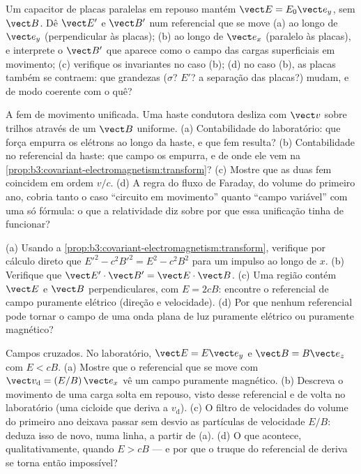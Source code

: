 \begin{exercise}[$\star$]\label{exo:b3:covariant-electromagnetism:4}
Um capacitor de placas paralelas em repouso mantém
$\vect E = E_0\vect e_y$, sem $\vect B$. Dê $\vect E'$ e $\vect B'$ num
referencial que se move (a) ao longo de $\vect e_y$ (perpendicular às
placas); (b) ao longo de $\vect
e_x$ (paralelo às placas), e interprete o $\vect B'$ que aparece como o
campo das cargas superficiais em movimento; (c) verifique os
invariantes no caso (b); (d) no caso (b), as placas também se contraem:
que grandezas ($\sigma$? $E'$? a separação das placas?) mudam, e de
modo coerente com o quê?
\end{exercise}

\begin{exercise}[$\star\star$]\label{exo:b3:covariant-electromagnetism:5}
A fem de movimento unificada. Uma haste condutora desliza com $\vect v$
sobre trilhos através de um $\vect B$ uniforme. (a) Contabilidade do
laboratório: que força empurra os elétrons ao longo da haste, e que fem
resulta? (b) Contabilidade no referencial da haste: que campo os
empurra, e de onde ele vem na
\cref{prop:b3:covariant-electromagnetism:transform}? (c) Mostre que as
duas fem coincidem em ordem $v/c$. (d) A regra do fluxo de Faraday, do
volume do primeiro ano, cobria tanto o caso ``circuito em movimento''
quanto ``campo variável'' com uma só fórmula: o que a relatividade diz
sobre por que essa unificação tinha de funcionar?
\end{exercise}

\begin{exercise}[$\star\star$]\label{exo:b3:covariant-electromagnetism:6}
(a) Usando a \cref{prop:b3:covariant-electromagnetism:transform},
verifique por cálculo direto que $E'^2 - c^2B'^2 = E^2 - c^2B^2$ para
um impulso ao longo de $x$. (b) Verifique que $\vect E'\cdot\vect B' = \vect
E\cdot\vect B$. (c) Uma região contém $\vect E$ e $\vect B$
perpendiculares, com $E = 2cB$: encontre o referencial de campo
puramente elétrico (direção e velocidade). (d) Por que nenhum
referencial pode tornar o campo de uma onda plana de luz puramente
elétrico ou puramente magnético?
\end{exercise}

\begin{exercise}[$\star\star$]\label{exo:b3:covariant-electromagnetism:7}
Campos cruzados. No laboratório, $\vect E = E\vect e_y$ e $\vect B =
B\vect e_z$ com $E < cB$. (a) Mostre que o referencial que se move com
$\vect v_{\text{d}} = (E/B)\,\vect e_x$ vê um campo puramente
magnético. (b) Descreva o movimento de uma carga solta em repouso,
visto desse referencial e de volta no laboratório (uma cicloide que
deriva a $v_{\text{d}}$). (c) O filtro de velocidades do volume do
primeiro ano deixava passar sem desvio as partículas de velocidade
$E/B$: deduza isso de novo, numa linha, a partir de (a). (d) O que
acontece, qualitativamente, quando $E > cB$ --- e por que o truque do
referencial de deriva se torna então impossível?
\end{exercise}

